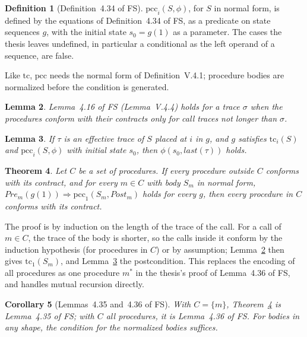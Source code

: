 \documentclass[11pt]{article}
\newcommand{\Pre}{\mathit{Pre}}
\newcommand{\Post}{\mathit{Post}}
\newcommand{\tc}{\mathrm{tc}}
\newcommand{\pcc}{\mathrm{pcc}}
\newcommand{\Th}[1]{#1 of FS}
\theoremstyle{plain}
\newtheorem{theorem}{Theorem}[section]
\newtheorem{lemma}[theorem]{Lemma}
\newtheorem{corollary}[theorem]{Corollary}
\theoremstyle{definition}
\newtheorem{definition}[theorem]{Definition}
\theoremstyle{remark}
\begin{document}
\begin{definition}[\Th{Definition~4.34}]\label{def:pcc}
  $\pcc_i(S, \phi)$, for $S$ in normal form, is defined by the equations of
  \Th{Definition~4.34}, as a predicate on state sequences $g$, with the
  initial state $s_0 = g(1)$ as a parameter. The cases the thesis leaves
  undefined, in particular a conditional as the left operand of a
  sequence, are false.
\end{definition}

Like $\tc$, $\pcc$ needs the normal form of Definition~V.4.1; procedure
bodies are normalized before the condition is generated.

\begin{lemma}\label{lem:tc-below}
  \Th{Lemma~4.16} (Lemma~V.4.4) holds for a trace $\sigma$ when the
  procedures conform with their contracts only for call traces not longer
  than $\sigma$.
\end{lemma}

\begin{lemma}\label{lem:pcc-sound}
  If $\tau$ is an effective trace of $S$ placed at $i$ in $g$, and $g$
  satisfies $\tc_i(S)$ and $\pcc_i(S, \phi)$ with initial state $s_0$, then
  $\phi(s_0, \mathit{last}(\tau))$ holds.
\end{lemma}

\begin{theorem}\label{thm:pcc-set}
  Let $C$ be a set of procedures. If every procedure outside $C$ conforms
  with its contract, and for every $m \in C$ with body $S_m$ in normal
  form, $\Pre_m(g(1)) \Rightarrow \pcc_1(S_m, \Post_m)$ holds for every
  $g$, then every procedure in $C$ conforms with its contract.
\end{theorem}

The proof is by induction on the length of the trace of the call. For a
call of $m \in C$, the trace of the body is shorter, so the calls inside
it conform by the induction hypothesis (for procedures in $C$) or by
assumption; Lemma~\ref{lem:tc-below} then gives $\tc_1(S_m)$, and
Lemma~\ref{lem:pcc-sound} the postcondition. This replaces the encoding of
all procedures as one procedure $m^*$ in the thesis's proof of
\Th{Lemma~4.36}, and handles mutual recursion directly.

\begin{corollary}[\Th{Lemmas~4.35 and~4.36}]
  With $C = \{m\}$, Theorem~\ref{thm:pcc-set} is \Th{Lemma~4.35}; with $C$
  all procedures, it is \Th{Lemma~4.36}. For bodies in any shape, the
  condition for the normalized bodies suffices.
\end{corollary}
\end{document}
